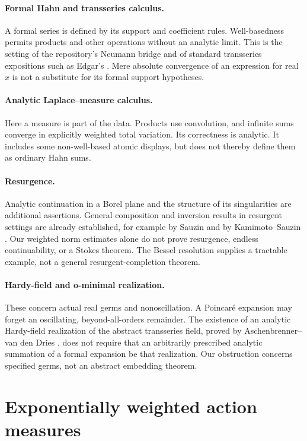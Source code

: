 \documentclass[11pt,a4paper]{article}
\theoremstyle{definition}
\theoremstyle{remark}
\numberwithin{equation}{section}
\begin{document}
\paragraph{Formal Hahn and transseries calculus.}
A formal series is defined by its support and coefficient rules. Well-basedness permits products and other operations without an analytic limit. This is the setting of the repository's Neumann bridge and of standard transseries expositions such as Edgar's \cite{edgar}. Mere absolute convergence of an expression for real $x$ is not a substitute for its formal support hypotheses.

\paragraph{Analytic Laplace--measure calculus.}
Here a measure is part of the data. Products use convolution, and infinite sums converge in explicitly weighted total variation. Its correctness is analytic. It includes some non-well-based atomic displays, but does not thereby define them as ordinary Hahn sums.

\paragraph{Resurgence.}
Analytic continuation in a Borel plane and the structure of its singularities are additional assertions. General composition and inversion results in resurgent settings are already established, for example by Sauzin and by Kamimoto--Sauzin \cite{sauzin,kamimoto}. Our weighted norm estimates alone do not prove resurgence, endless continuability, or a Stokes theorem. The Bessel resolution supplies a tractable example, not a general resurgent-completion theorem.

\paragraph{Hardy-field and o-minimal realization.}
These concern actual real germs and nonoscillation. A Poincar\'e expansion may forget an oscillating, beyond-all-orders remainder. The existence of an analytic Hardy-field realization of the abstract transseries field, proved by Aschenbrenner--van den Dries \cite{hardy}, does not require that an arbitrarily prescribed analytic summation of a formal expansion be that realization. Our obstruction concerns specified germs, not an abstract embedding theorem.

\section{Exponentially weighted action measures}\label{sec:measures}
\end{document}
